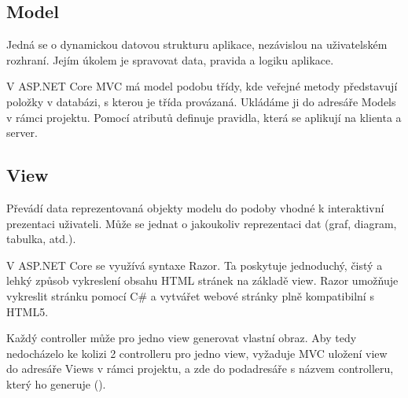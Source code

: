 \documentclass[a4paper, 12pt]{report}
\begin{document}
	\subsection{Model} \label{Model_teorie}
	Jedná se o dynamickou datovou strukturu aplikace, nezávislou na uživatelském rozhraní. Jejím úkolem je spravovat data, pravida a logiku aplikace. \par
	V ASP.NET Core MVC má model podobu třídy, kde veřejné metody představují položky v databázi, s kterou je třída provázaná. Ukládáme ji do adresáře Models v rámci projektu. Pomocí atributů definuje pravidla, která se aplikují na klienta a server.\cite{MVC_Wiki_EN}

	\subsection{View}
	Převádí data reprezentovaná objekty modelu do podoby vhodné k interaktivní prezentaci uživateli.\cite{MVC_Wiki_CZ} Může se jednat o jakoukoliv reprezentaci dat (graf, diagram, tabulka, atd.).\par
	V ASP.NET Core se využívá syntaxe Razor. Ta poskytuje jednoduchý, čistý a lehký způsob vykreslení obsahu HTML stránek na základě view. Razor umožňuje vykreslit stránku pomocí C\# a vytvářet webové stránky plně kompatibilní s HTML5.\cite{MVC_Wiki_EN}\par
	Každý controller může pro jedno view generovat vlastní obraz. Aby tedy nedocházelo ke kolizi 2 controlleru pro jedno view, vyžaduje  MVC uložení view do adresáře Views v rámci projektu, a zde do podadresáře s názvem controlleru, který ho generuje ().
\end{document}
